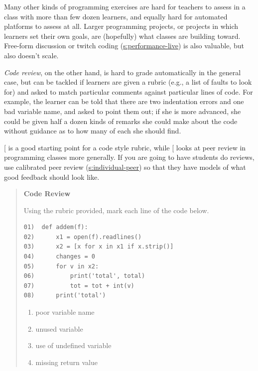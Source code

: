 Many other kinds of programming exercises are hard for teachers to
assess in a class with more than few dozen learners, and equally hard
for automated platforms to assess at all. Larger programming projects,
or projects in which learners set their own goals, are (hopefully) what
classes are building toward. Free-form discussion or twitch coding
(\protect\hyperlink{SECTION}{s:performance-live}) is also valuable, but also doesn't
scale.

\emph{Code review}, on the other hand, is hard to grade automatically in the
general case, but can be tackled if learners are given a rubric (e.g., a
list of faults to look for) and asked to match particular comments
against particular lines of code. For example, the learner can be told
that there are two indentation errors and one bad variable name, and
asked to point them out; if she is more advanced, she could be given
half a dozen kinds of remarks she could make about the code without
guidance as to how many of each she should find.

{[}\protect[\hyperlink{b:Steg2016b}{Steg2016b}]{]} is a good starting point for a code style rubric,
while {[}\protect[\hyperlink{b:Luxt2009}{Luxt2009}]{]} looks at peer review in programming classes
more generally. If you are going to have students do reviews, use
calibrated peer review (\protect\hyperlink{SECTION}{s:individual-peer}) so that they
have models of what good feedback should look like.

\begin{quote}\setlength{\parindent}{0pt}
\textbf{Code Review}

Using the rubric provided, mark each line of the code below.

\begin{lstlisting}
01)  def addem(f):
02)      x1 = open(f).readlines()
03)      x2 = [x for x in x1 if x.strip()]
04)      changes = 0
05)      for v in x2:
06)          print('total', total)
07)          tot = tot + int(v)
08)      print('total')
\end{lstlisting}

\begin{enumerate}
\tightlist
\item
  poor variable name
\item
  unused variable
\item
  use of undefined variable
\item
  missing return value
\end{enumerate}
\end{quote}

